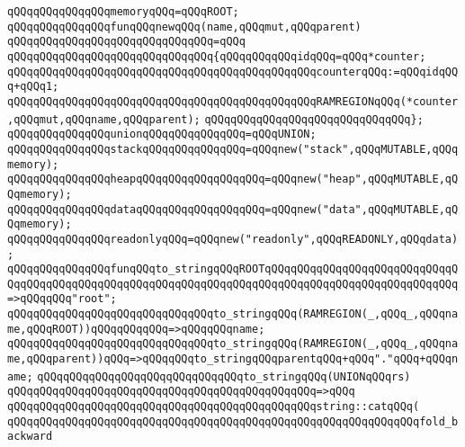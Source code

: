\verb|qQQqqQQqqQQqqQQqmemoryqQQq=qQQqROOT;|\newline
\newline
\verb|qQQqqQQqqQQqqQQqfunqQQqnewqQQq(name,qQQqmut,qQQqparent)|\newline
\verb|qQQqqQQqqQQqqQQqqQQqqQQqqQQqqQQq=qQQq|\newline
\verb|qQQqqQQqqQQqqQQqqQQqqQQqqQQqqQQq{qQQqqQQqqQQqidqQQq=qQQq*counter;|\newline
\verb|qQQqqQQqqQQqqQQqqQQqqQQqqQQqqQQqqQQqqQQqqQQqqQQqcounterqQQq:=qQQqidqQQq+qQQq1;|\newline
\verb|qQQqqQQqqQQqqQQqqQQqqQQqqQQqqQQqqQQqqQQqqQQqqQQqRAMREGIONqQQq(*counter,qQQqmut,qQQqname,qQQqparent);|\newline
\verb|qQQqqQQqqQQqqQQqqQQqqQQqqQQqqQQq};|\newline
\newline
\verb|qQQqqQQqqQQqqQQqunionqQQqqQQqqQQqqQQq=qQQqUNION;|\newline
\verb|qQQqqQQqqQQqqQQqstackqQQqqQQqqQQqqQQq=qQQqnew("stack",qQQqMUTABLE,qQQqmemory);|\newline
\verb|qQQqqQQqqQQqqQQqheapqQQqqQQqqQQqqQQqqQQq=qQQqnew("heap",qQQqMUTABLE,qQQqmemory);|\newline
\verb|qQQqqQQqqQQqqQQqdataqQQqqQQqqQQqqQQqqQQq=qQQqnew("data",qQQqMUTABLE,qQQqmemory);|\newline
\verb|qQQqqQQqqQQqqQQqreadonlyqQQq=qQQqnew("readonly",qQQqREADONLY,qQQqdata);|\newline
\newline
\verb|qQQqqQQqqQQqqQQqfunqQQqto_stringqQQqROOTqQQqqQQqqQQqqQQqqQQqqQQqqQQqqQQqqQQqqQQqqQQqqQQqqQQqqQQqqQQqqQQqqQQqqQQqqQQqqQQqqQQqqQQqqQQqqQQqqQQq=>qQQqqQQq"root";|\newline
\verb|qQQqqQQqqQQqqQQqqQQqqQQqqQQqqQQqto_stringqQQq(RAMREGION(_,qQQq_,qQQqname,qQQqROOT))qQQqqQQqqQQq=>qQQqqQQqname;|\newline
\verb|qQQqqQQqqQQqqQQqqQQqqQQqqQQqqQQqto_stringqQQq(RAMREGION(_,qQQq_,qQQqname,qQQqparent))qQQq=>qQQqqQQqto_stringqQQqparentqQQq+qQQq"."qQQq+qQQqname;|\newline
\newline
\verb|qQQqqQQqqQQqqQQqqQQqqQQqqQQqqQQqto_stringqQQq(UNIONqQQqrs)|\newline
\verb|qQQqqQQqqQQqqQQqqQQqqQQqqQQqqQQqqQQqqQQqqQQqqQQq=>qQQq|\newline
\verb|qQQqqQQqqQQqqQQqqQQqqQQqqQQqqQQqqQQqqQQqqQQqqQQqstring::catqQQq(|\newline
\verb|qQQqqQQqqQQqqQQqqQQqqQQqqQQqqQQqqQQqqQQqqQQqqQQqqQQqqQQqqQQqqQQqfold_backward|\newline
